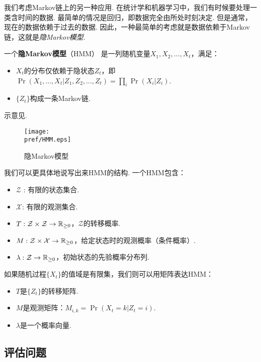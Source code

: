 我们考虑Markov链上的另一种应用. 在统计学和机器学习中，我们有时候要处理一类含时间的数据. 最简单的情况是回归，即数据完全由所处时刻决定. 但是通常，现在的数据依赖于过去的数据. 因此，一种最简单的考虑就是数据依赖于Markov链，这就是\emph{隐Markov模型}.

\begin{definition}[隐Markov模型]
一个\textbf{隐Markov模型}（HMM） 是一列随机变量$X_1,X_2,\dots, X_t$，满足：
    \begin{itemize}
        \item $X_t$的分布仅依赖于隐状态$Z_t$，即$\Pr(X_1,\dots,X_t|Z_1,Z_2,\dots,Z_t)=\prod_i \Pr(X_i|Z_i)$.
        \item $\{Z_t\}$构成一条Markov链.
    \end{itemize}
\end{definition}
示意见.
\begin{figure}[ht]
    \centering
    \texttt{[image: \\pref/HMM.eps]}
    \caption{隐Markov模型}
    \label{fig:HMM}
\end{figure}    



我们可以更具体地说写出来HMM的结构. 一个HMM包含：
    \begin{itemize}
        \item $\mathcal Z$
        : 有限的状态集合.
        \item $\mathcal X$: 有限的观测集合.
        \item $T: \mathcal Z\times\mathcal Z\to \mathbb{R}_{\geq 0}$，$\mathcal Z$的转移概率.
        \item $M:\mathcal Z\times \mathcal X\to \mathbb{R}_{\geq 0}$，给定状态时的观测概率（条件概率）.
        \item $\lambda:\mathcal Z\to\mathbb{R}_{\geq 0}$，初始状态的先验概率分布列.
    \end{itemize}
如果随机过程$\{X_t\}$的值域是有限集，我们则可以用矩阵表达HMM：
    \begin{itemize}
    \item $T$是$\{Z_t\}$的转移矩阵.
    \item $M$是观测矩阵：$M_{i,k} = \Pr(X_t=k|Z_t=i)$.
    \item $\lambda$是一个概率向量.
    \end{itemize}


\subsection{评估问题}

